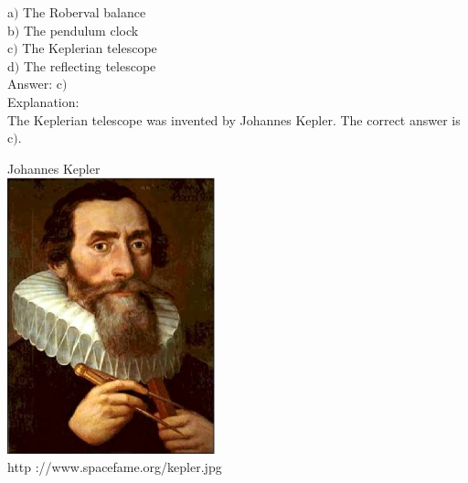 \documentclass[letterpaper, 12pt]{article}
\begin{document}
a$)$ The Roberval balance \\
b$)$ The pendulum clock \\
c$)$ The Keplerian telescope \\
d$)$ The reflecting telescope\\

Answer: c$)$\\

Explanation: \\
The Keplerian telescope was invented by Johannes Kepler.
The correct answer is c$)$.\\

        \begin{center}
        Johannes Kepler\\
    \includegraphics[width=6cm]{kepler.eps}\\
        {\footnotesize http ://www.spacefame.org/kepler.jpg}
    \end{center}
\end{document}

